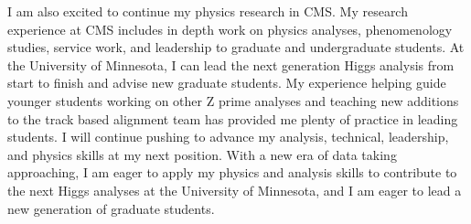\documentclass[11pt]{article}
\begin{document}



I am also excited to continue my physics research in CMS. My research experience at CMS includes in depth work on physics analyses, phenomenology studies, service work, and leadership to graduate and undergraduate students. At the University of Minnesota, I can lead the next generation Higgs analysis from start to finish and advise new graduate students. My experience helping guide younger students working on other Z prime analyses and teaching new additions to the track based alignment team has provided me plenty of practice in leading students. I will continue pushing to advance my analysis, technical, leadership, and physics skills at my next position. With a new era of data taking approaching, I am eager to apply my physics and analysis skills to contribute to the next Higgs analyses at the University of Minnesota, and I am eager to lead a new generation of graduate students. 
\end{document}
